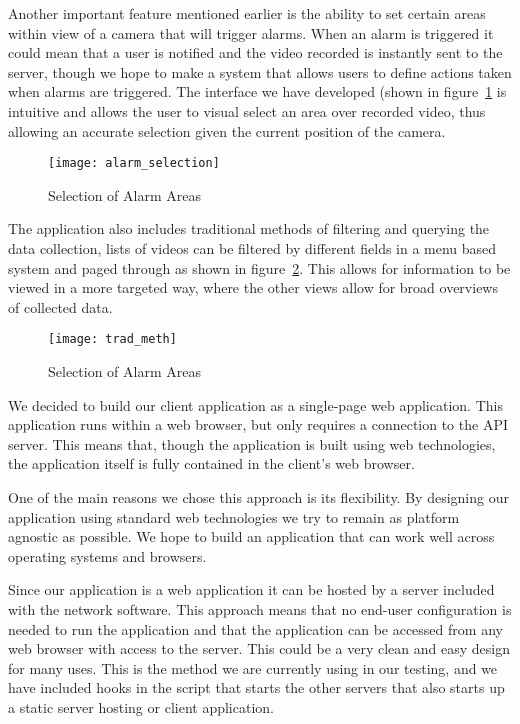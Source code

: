 Another important feature mentioned earlier is the ability to set certain areas
within view of a camera that will trigger alarms. When an alarm is triggered it
could mean that a user is notified and the video recorded is instantly sent to
the server, though we hope to make a system that allows users to define actions
taken when alarms are triggered. The interface we have developed (shown in
figure~\ref{alarm_selection} is intuitive and allows the user to visual select
an area over recorded video, thus allowing an accurate selection given the
current position of the camera.

\begin{figure}[!t]
\centering
\texttt{[image: alarm\_selection]}
\caption{Selection of Alarm Areas}
\label{alarm_selection}
\end{figure}

The application also includes traditional methods of filtering and querying the
data collection, lists of videos can be filtered by different fields in a menu
based system and paged through as shown in figure~\ref{trad_meth}. This allows
for information to be viewed in a more targeted way, where the other views allow
for broad overviews of collected data.

\begin{figure}[!t]
\centering
\texttt{[image: trad\_meth]}
\caption{Selection of Alarm Areas}
\label{trad_meth}
\end{figure}

We decided to build our client application as a single-page web application.
This application runs within a web browser, but only requires a connection to
the API server. This means that, though the application is built using web
technologies, the application itself is fully contained in the client's web
browser.

One of the main reasons we chose this approach is its flexibility. By designing
our application using standard web technologies we try to remain as platform
agnostic as possible. We hope to build an application that can work well across
operating systems and browsers.

Since our application is a web application it can be hosted by a server included
with the network software. This approach means that no end-user configuration is
needed to run the application and that the application can be accessed from any
web browser with access to the server. This could be a very clean and easy
design for many uses. This is the method we are currently using in our testing,
and we have included hooks in the script that starts the other servers that also
starts up a static server hosting or client application.


